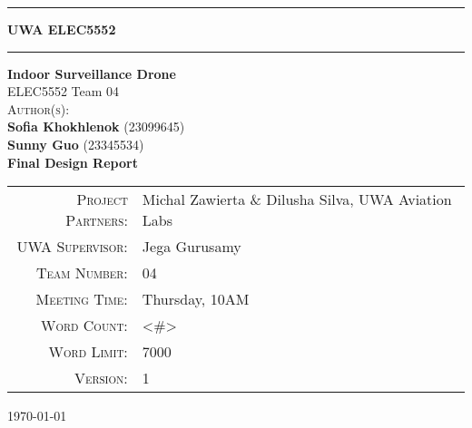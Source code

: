 \begin{titlepage}

\noindent\rule{\textwidth}{0.5pt}
\begin{flushright}
    \textbf{UWA ELEC5552}
\end{flushright}
\rule{\textwidth}{0.5pt}

\vspace{2cm}

\thispagestyle{empty}

\begin{center}
    {\Huge \textbf{Indoor Surveillance Drone}} \\[0.75cm]
    {\Large ELEC5552 Team 04} \\[1.5cm]

    \textsc{Author(s):} \\[0.3cm]
    \textbf{Sofia Khokhlenok} (23099645) \\
    \textbf{Sunny Guo} (23345534) \\ [1.5cm]

    {\Large \textbf{Final Design Report}} \\[0.5cm]
\end{center}

\vspace{1.5cm}

\begin{center}
\begin{tabular}{rl}
\textsc{Project Partners:} & Michal Zawierta \& Dilusha Silva, UWA Aviation Labs \\
\textsc{UWA Supervisor:} & Jega Gurusamy \\
\textsc{Team Number:} & 04 \\
\textsc{Meeting Time:} & Thursday, 10AM \\
\textsc{Word Count:} & <\#> \\
\textsc{Word Limit:} & 7000 \\
\textsc{Version:} & 1 \\
\end{tabular}
\end{center}

\vfill

\begin{center}
    \large \today
\end{center}

\end{titlepage}
